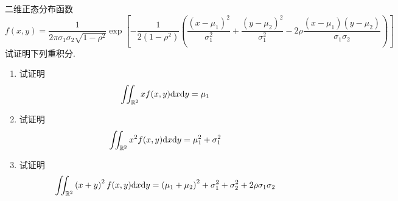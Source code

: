 \documentclass{ctexart}
\begin{document}
\begin{problem}[5.]
    二维正态分布函数
    \[f(x,y)=\dfrac{1}{2\pi\sigma_1\sigma_2\sqrt{1-\rho^2}}\exp\left[-\dfrac{1}{2\left(1-\rho^2\right)}\left(\dfrac{\left(x-\mu_1\right)^2}{\sigma_1^2}+\dfrac{\left(y-\mu_2\right)^2}{\sigma_1^2}-2\rho\dfrac{\left(x-\mu_1\right)\left(y-\mu_2\right)}{\sigma_1\sigma_2}\right)\right]\]
    试证明下列重积分.
    \begin{enumerate}[label=\tbf{(\arabic*)}]
        \item 试证明\[\iint_{\mathbb{R}^2}xf(x,y)\mathrm{d} x\mathrm{d} y=\mu_1\]
        \item 试证明\[\iint_{\mathbb{R}^2}x^2f(x,y)\mathrm{d} x\mathrm{d} y=\mu_1^2+\sigma_1^2\]
        \item 试证明\[\iint_{\mathbb{R}^2}\left(x+y\right)^2f(x,y)\mathrm{d} x\mathrm{d} y=\left(\mu_1+\mu_2\right)^2+\sigma_1^2+\sigma_2^2+2\rho\sigma_1\sigma_2\]
    \end{enumerate}
\end{problem}
\end{document}
